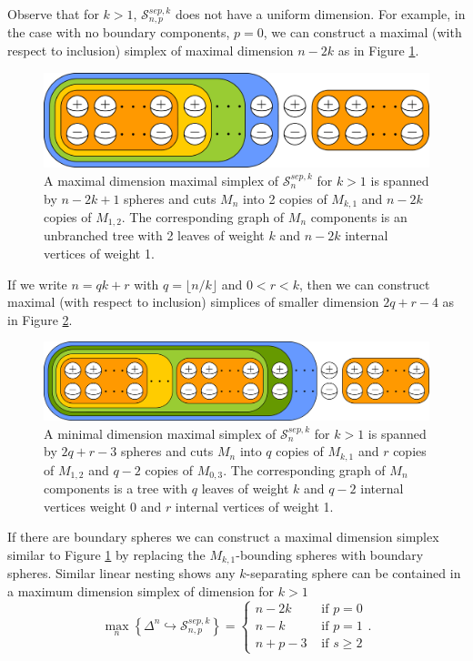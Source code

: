Observe that for $k>1$,
$\mathcal S^{sep,k}_{n,p}$
does not have a uniform dimension.
For example, in the case with no boundary components, $p=0$,
we can construct
a maximal (with respect to inclusion)
simplex of maximal dimension
\hbox{$n-2k$}
as in Figure \ref{bigsimp}.
\begin{figure}[b!]
\includegraphics[width=\textwidth]{figures/bigsimplex.pdf}
\caption{A maximal dimension maximal simplex of $\mathcal S^{sep,k}_{n}$ for $k>1$
is spanned by $n-2k+1$ spheres and cuts $M_n$ into 2 copies of $M_{k,1}$ and $n-2k$
copies of $M_{1,2}$.
The corresponding graph of $M_{n}$ components is an unbranched tree
with 2 leaves of weight $k$ and $n-2k$ internal vertices of weight 1.}
\label{bigsimp}
\end{figure}
If we write $n=qk+r$ with $q = \lfloor n/k \rfloor$ and $0<r<k$,
then we can construct maximal (with respect to inclusion) simplices
of smaller dimension $2q+r-4$ as in Figure \ref{lilsimp}.
\begin{figure}[b!]
\includegraphics[width=\textwidth]{figures/smallersimplex.pdf}
\caption{A minimal dimension maximal simplex of $\mathcal S^{sep,k}_{n}$ for $k>1$
is spanned by $2q+r-3$ spheres and cuts $M_n$
into $q$ copies of $M_{k,1}$ and $r$ copies of $M_{1,2}$ and $q-2$ copies of $M_{0,3}$.
The corresponding graph of $M_{n}$ components is a tree
with $q$ leaves of weight $k$ and $q-2$ internal vertices weight 0
and $r$ internal vertices of weight 1.}
\label{lilsimp}
\end{figure}

If there are boundary spheres we can construct a maximal dimension simplex
similar to Figure \ref{bigsimp}
by replacing the $M_{k,1}$-bounding spheres with boundary spheres.
Similar linear nesting shows any $k$-separating sphere can be contained in a maximum dimension simplex
of dimension for $k>1$
$$
\max_n \left \{
\Delta^n \hookrightarrow
\mathcal S^{sep,k}_{n,p}
\right \}
=
\begin{cases}
  n-2k & \mbox{ if } p=0\\
  n-k & \mbox{ if } p=1\\
  n+p-3 & \mbox{ if } s\geq 2
\end{cases}.
$$

